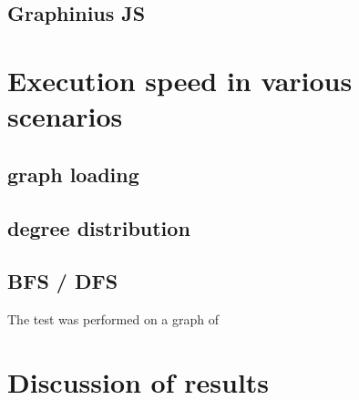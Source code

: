 	\subsection{Graphinius JS}
	\label{ssect:perf_graphinius}
	

\section{Execution speed in various scenarios}
\label{sect:performance}

	\subsection{graph loading}
	\label{ssect:perf_graph_loading}
	
	\subsection{degree distribution}
	\label{ssect:perf_deg_dist}
	
	\subsection{BFS / DFS}
	\label{ssect:perf_bfs_dfs}
	
	The test was performed on a graph of 


\section{Discussion of results}
\label{sect:discussion}
	